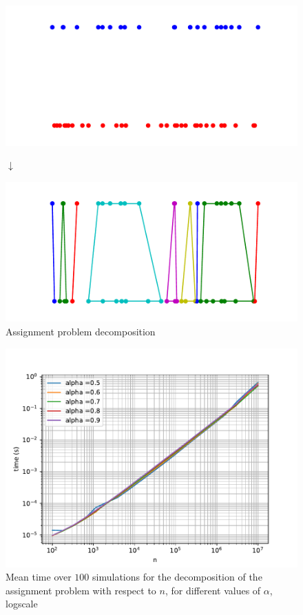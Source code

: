 \documentclass[a4paper,12pt]{article}
\begin{document}
\begin{figure}[H]
\includegraphics[width = \columnwidth]{before_decomp.pdf}
\begin{center}
$\downarrow$
\end{center}
\includegraphics[width = \columnwidth]{decomp_fig.pdf}
\caption{Assignment problem decomposition}\label{decomp_fig}
\end{figure}

\begin{figure}[H]
\includegraphics[width = \columnwidth]{decomp_time.pdf}
\caption{Mean time over $100$ simulations for the decomposition of the assignment problem with respect to $n$, for different values of $\alpha$, logscale}\label{decomp_time}
\end{figure}
\end{document}

